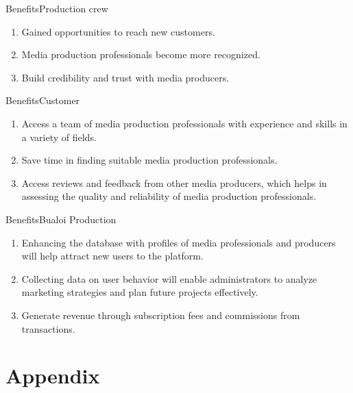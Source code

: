 \documentclass[aspectratio=169]{beamer}
\begin{document}
\begin{frame}{Benefits}{Production crew}
    \begin{enumerate}
        \item Gained opportunities to reach new customers.
        \item Media production professionals become more recognized.
        \item Build credibility and trust with media producers.
    \end{enumerate}
\end{frame}

\begin{frame}{Benefits}{Customer}
    \begin{enumerate}
        \item Access a team of media production professionals with experience and skills in a variety of fields.
        \item Save time in finding suitable media production professionals.
        \item Access reviews and feedback from other media producers, which helps in assessing the quality and reliability of media production professionals.
    \end{enumerate}
\end{frame}

\begin{frame}{Benefits}{Bualoi Production}
    \begin{enumerate}
        \item Enhancing the database with profiles of media professionals and producers will help attract new users to the platform.
        \item Collecting data on user behavior will enable administrators to analyze marketing strategies and plan future projects effectively.
        \item Generate revenue through subscription fees and commissions from transactions.
    \end{enumerate}
\end{frame}

\section{Appendix}
\end{document}
